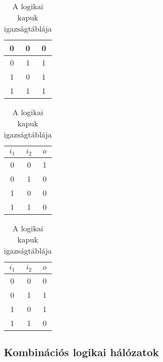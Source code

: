 \documentclass[../../main.tex]{subfiles}
\begin{document}
\begin{table}[H]
\begin{minipage}[t]{0.166\textwidth}
\begin{center}
\begin{tabular}{|c|c|c|}
        \\ \hline \hline
        0     & 0     & 0
        \\ \hline
        0     & 1     & 1
        \\ \hline
        1     & 0     & 1
        \\ \hline
        1     & 1     & 1
        \\ \hline
      \end{tabular}
    \end{center}
  \end{minipage}\hfill
  \begin{minipage}[t]{0.166\textwidth}
    \begin{center}
      \begin{tabular}{|c|c|c|}
        \hline
        $i_1$ & $i_2$ & $o$
        \\ \hline \hline
        0     & 0     & 1
        \\ \hline
        0     & 1     & 0
        \\ \hline
        1     & 0     & 0
        \\ \hline
        1     & 1     & 0
        \\ \hline
      \end{tabular}
    \end{center}
  \end{minipage}\hfill
  \begin{minipage}[t]{0.166\textwidth}
    \begin{center}
      \begin{tabular}{|c|c|c|}
        \hline
        $i_1$ & $i_2$ & $o$
        \\ \hline \hline
        0     & 0     & 0
        \\ \hline
        0     & 1     & 1
        \\ \hline
        1     & 0     & 1
        \\ \hline
        1     & 1     & 0
        \\ \hline
      \end{tabular}
    \end{center}
  \end{minipage}\hfill
  \caption{A logikai kapuk igazságtáblája}
  \label{table:truth-tables}
\end{table}

\subsection{Kombinációs logikai hálózatok}
\end{document}

